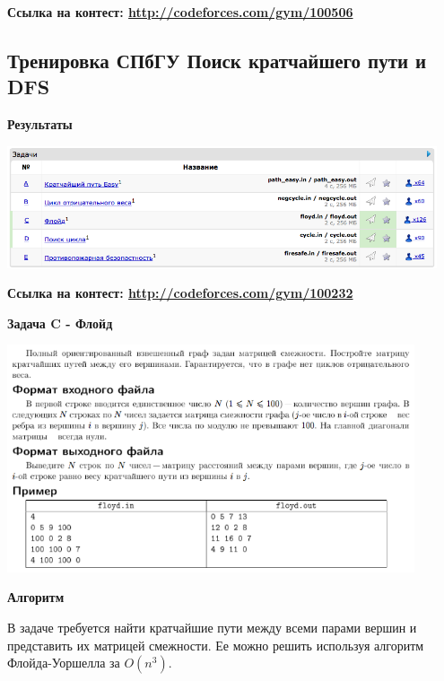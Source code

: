 \documentclass[a4paper,12pt]{article}
\begin{document}
\textbf{{\large Ссылка на контест: \url{http://codeforces.com/gym/100506}}}



%
%
\newpage
\subsection{Тренировка СПбГУ Поиск кратчайшего пути и DFS}

\textbf{{\large Результаты}} \\
\begin{center}
\includegraphics[width=0.95\textwidth]{SPBGU_GRAPHS/SPBGU_GRAPHS_result.png}\\ [1cm]
\end{center}

\textbf{{\large Ссылка на контест: \url{http://codeforces.com/gym/100232}}}

\newpage
\textbf{{\large Задача C - Флойд}}

\begin{center}
\includegraphics[width=0.9\textwidth]{SPBGU_GRAPHS/SPBGU_GRAPHS_C.png}\\ [1cm]
\end{center}

\textbf{{\large Алгоритм}}

В задаче требуется найти кратчайшие пути между всеми парами вершин и представить их матрицей смежности. Ее можно решить используя алгоритм Флойда-Уоршелла за $O(n^3)$.
\end{document}
